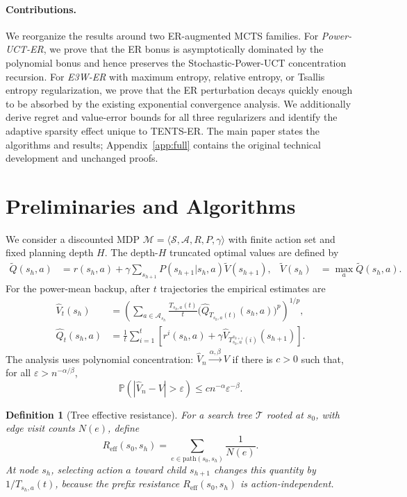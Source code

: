 \documentclass{article}
\newtheorem{definition}[theorem]{Definition}
\newcommand{\Prob}{\mathbb{P}}
\newcommand{\Reff}{R_{\mathrm{eff}}}
\newcommand{\Vhat}{\widehat{V}}
\newcommand{\Qhat}{\widehat{Q}}
\begin{document}
\paragraph{Contributions.}
We reorganize the results around two ER-augmented MCTS families.  For \emph{Power-UCT-ER}, we prove that the ER bonus is asymptotically dominated by the polynomial bonus and hence preserves the Stochastic-Power-UCT concentration recursion.  For \emph{E3W-ER} with maximum entropy, relative entropy, or Tsallis entropy regularization, we prove that the ER perturbation decays quickly enough to be absorbed by the existing exponential convergence analysis.  We additionally derive regret and value-error bounds for all three regularizers and identify the adaptive sparsity effect unique to TENTS-ER.  The main paper states the algorithms and results; Appendix~\ref{app:full} contains the original technical development and unchanged proofs.

\section{Preliminaries and Algorithms}
\label{sec:main_prelim}
We consider a discounted MDP $\mathcal{M}=\langle\mathcal{S},\mathcal{A},R,P,\gamma\rangle$ with finite action set and fixed planning depth $H$.  The depth-$H$ truncated optimal values are defined by
\begin{align}
\widetilde{Q}(s_h,a)&=r(s_h,a)+\gamma\sum_{s_{h+1}}P(s_{h+1}|s_h,a)\widetilde{V}(s_{h+1}),
& \widetilde{V}(s_h)&=\max_a\widetilde{Q}(s_h,a).
\label{eq:main_truncated_values}
\end{align}
For the power-mean backup, after $t$ trajectories the empirical estimates are
\begin{align}
\Vhat_t(s_h)&=\left(\sum_{a\in\mathcal{A}_{s_h}}\frac{T_{s_h,a}(t)}{t}\bigl(\Qhat_{T_{s_h,a}(t)}(s_h,a)\bigr)^p\right)^{1/p},
\label{eq:main_power_backup}\\
\Qhat_t(s_h,a)&=\frac{1}{t}\sum_{i=1}^{t}\left[r^i(s_h,a)+\gamma\Vhat_{T^{s_{h+1}}_{s_h,a}(i)}(s_{h+1})\right].
\label{eq:main_q_backup}
\end{align}
The analysis uses polynomial concentration: $\Vhat_n\xrightarrow{\alpha,\beta}V$ if there is $c>0$ such that, for all $\varepsilon>n^{-\alpha/\beta}$,
\begin{equation}
\Prob(|\Vhat_n-V|>\varepsilon)\leq c n^{-\alpha}\varepsilon^{-\beta}.
\label{eq:main_poly_conc}
\end{equation}

\begin{definition}[Tree effective resistance]
For a search tree $\mathcal{T}$ rooted at $s_0$, with edge visit counts $N(e)$, define
\[
\Reff(s_0,s_h)=\sum_{e\in\mathrm{path}(s_0,s_h)}\frac{1}{N(e)}.
\]
At node $s_h$, selecting action $a$ toward child $s_{h+1}$ changes this quantity by $1/T_{s_h,a}(t)$, because the prefix resistance $\Reff(s_0,s_h)$ is action-independent.
\end{definition}
\end{document}
